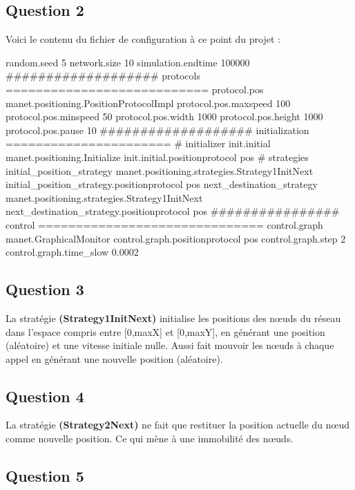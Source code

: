 \documentclass[10pt]{report}
\begin{document}
\subsection{Question 2}
Voici le contenu du fichier de configuration à ce point du projet :
\newline
\newline
\noindent\begin{minipage}{\textwidth}
\begin{shaded}
\begin{boxedlisting}
random.seed 5
network.size 10
simulation.endtime 100000
################### protocols ===========================
protocol.pos manet.positioning.PositionProtocolImpl
protocol.pos.maxspeed 100
protocol.pos.minspeed 50
protocol.pos.width 1000
protocol.pos.height 1000
protocol.pos.pause 10
################### initialization ======================
# initializer
init.initial manet.positioning.Initialize
init.initial.positionprotocol pos
# strategies
initial_position_strategy manet.positioning.strategies.Strategy1InitNext
initial_position_strategy.positionprotocol pos
next_destination_strategy manet.positioning.strategies.Strategy1InitNext
next_destination_strategy.positionprotocol pos
################ control ==============================
control.graph manet.GraphicalMonitor
control.graph.positionprotocol pos
control.graph.step 2
control.graph.time_slow 0.0002
\end{boxedlisting}
\end{shaded}
\end{minipage}

\subsection{Question 3}
La stratégie \textbf{(Strategy1InitNext)} initialise les positions des nœuds du réseau dans l'espace compris entre [0,maxX] et [0,maxY], en générant une position (aléatoire) et une vitesse initiale nulle. Aussi fait mouvoir les nœuds à chaque appel en générant une nouvelle position (aléatoire).

\subsection{Question 4}
La stratégie \textbf{(Strategy2Next)} ne fait que restituer la position actuelle du nœud comme nouvelle position. Ce qui mène à une immobilité des nœuds.

\subsection{Question 5}
\end{document}
